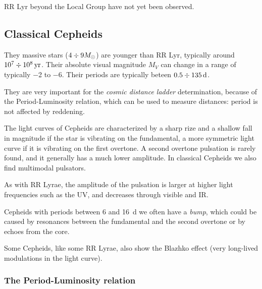 \documentclass[main.tex]{subfiles}
\begin{document}
RR Lyr beyond the Local Group have not
yet been observed.

\subsection{Classical Cepheids}

They massive stars (\(4 \divisionsymbol 9 M_{\odot}\)) are younger than RR Lyr, typically around \(\num{e7} \divisionsymbol \SI{e8}{yr}\).
Their absolute visual magnitude \(M_V\) can change in a range of typically \num{-2} to \num{-6}. 
Their periods are typically beteen \(\num{.5} \divisionsymbol \SI{135}{d}\). 

They are very important for the \emph{cosmic distance ladder} determination, because of the Period-Luminosity relation, which can be used to measure distances: period is not affected by reddening.

The light curves of Cepheids are characterized by a sharp rize and a shallow fall in magnitude if the star is vibrating on the fundamental, a more symmetric light curve if it is vibrating on the first overtone. 
A second overtone pulsation is rarely found, and it generally has a much lower amplitude. 
In classical Cepheids we also find multimodal pulsators. 

As with RR Lyrae, the amplitude of the pulsation is larger at higher light frequencies such as the UV, and decreases through visible and IR.

Cepheids with periods between \num{6} and \SI{16}{d} we often have a \emph{bump}, which could be caused by resonances between the fundamental and the second overtone or by echoes from the core.

Some Cepheids, like some RR Lyrae, also show the Blazhko effect (very long-lived modulations in the light curve).

\subsubsection{The Period-Luminosity relation}
\end{document}

